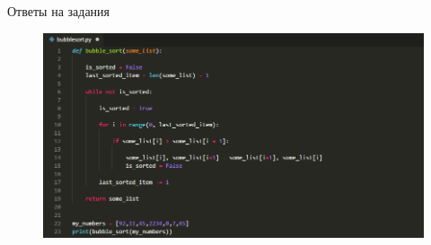 \documentclass[8pt,pdf,hyperref={unicode}, xcolor=dvipsnames, fleqn]{beamer}
\begin{document}
\begin{frame}{Ответы на задания}


\begin{figure}
	\includegraphics[width=1.0\textwidth]{Images/res.PNG}
\end{figure}


\end{frame}
\end{document}
